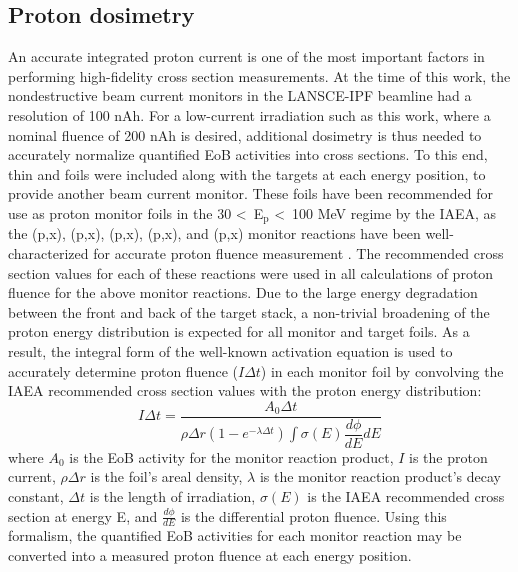 \documentclass[3p]{elsarticle}
\newcommand{\pp}[1]{\left( #1\right)}
\newcommand{\comment}[1]{\todo[color=blue!20!white,inline]{ASV: #1}}
\begin{document}


\subsection{Proton dosimetry}\label{sec:dosimetry}


An accurate integrated proton current is one of the most important factors in performing high-fidelity cross section measurements.
At the time of this work, the nondestructive beam current monitors in the LANSCE-IPF beamline had a  resolution of 100 nAh.
For a low-current irradiation such as this work, where a nominal fluence of 200 nAh is desired, additional dosimetry is thus needed to accurately normalize quantified EoB activities into cross sections.
To this end, thin  and  foils were included along with the  targets at each energy position, to provide another beam current monitor.
These foils have been recommended for use as proton monitor foils in the 30 \textless\ E$_\text{p}$ \textless\ 100 MeV regime by the IAEA, as the (p,x), (p,x), (p,x), (p,x), and (p,x) monitor reactions have been well-characterized for accurate proton fluence measurement \cite{gul2001charged}.
The recommended cross section values for each of these reactions were used in all calculations of proton fluence for the above monitor reactions.
Due to the large energy degradation between the front and  back of the target stack, a non-trivial broadening of the proton energy distribution is expected for all monitor and target foils.
As a result, the integral form of the well-known activation equation is used to accurately determine proton fluence ($I \Delta t $) in each monitor foil by convolving the IAEA recommended cross section values with the proton energy distribution:
\begin{equation}
I \Delta t = \dfrac{A_0 \Delta t}{\rho \Delta r \pp{1-e^{-\lambda \Delta t}} \int \sigma\pp{E} \dfrac{d\phi}{dE} dE}
\end{equation}
where $A_0$ is the EoB activity for the monitor reaction product, $I$ is the proton current, $\rho \Delta r$ is the foil's areal density, $\lambda$ is the monitor reaction product's decay constant, $\Delta t$ is the length of irradiation, $\sigma\pp{E}$ is the IAEA recommended cross section at energy E, and $\frac{d\phi}{dE}$ is the differential proton fluence.
Using this formalism, the quantified EoB activities for each monitor reaction may be converted into a measured proton fluence at each energy position.
\end{document}
